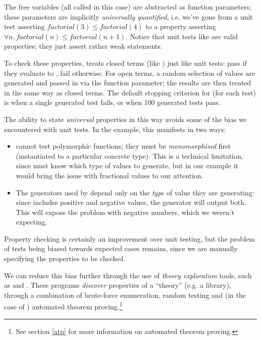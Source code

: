 The free variables (all called  in this case) are abstracted as function parameters; these parameters are implicitly \emph{universally quantified}, i.e. we've gone from a unit test asserting $factorial(3) \leq factorial(4)$ to a property asserting $\forall n, factorial(n) \leq factorial(n+1)$. Notice that unit tests like  are valid properties; they just assert rather weak statements.

To check these properties, \qcheck{} treats closed terms (like ) just like unit tests: pass if they evaluate to , fail otherwise. For open terms, a random selection of values are generated and passed in via the function parameter; the results are then treated in the same way as closed terms. The default stopping criterion for \qcheck{} (for each test) is when a single generated test fails, or when 100 generated tests pass.

The ability to state \emph{universal} properties in this way avoids some of the bias we encountered with unit tests. In the  example, this manifests in two ways:

\begin{itemize}
  \item \qcheck{} cannot test polymorphic functions; they must be \emph{monomorphised} first (instantiated to a particular concrete type). This is a technical limitation, since \qcheck{} must know which type of values to generate, but in our example it would bring the issue with fractional values to our attention.

  \item The generators used by \qcheck{} depend only on the \emph{type} of value they are generating: since  includes positive and negative values, the  generator will output both. This will expose the problem with negative numbers, which we weren't expecting.
\end{itemize}

Property checking is certainly an improvement over unit testing, but the problem of tests being biased towards expected cases remains, since we are manually specifying the properties to be checked.

We can reduce this bias further through the use of \emph{theory exploration} tools, such as \qspec{} and \hspec{}. These programs \emph{discover} properties of a ``theory'' (e.g. a library), through a combination of brute-force enumeration, random testing and (in the case of \hspec{}) automated theorem proving.\footnote{See section \ref{atp} for more information on automated theorem proving.}

